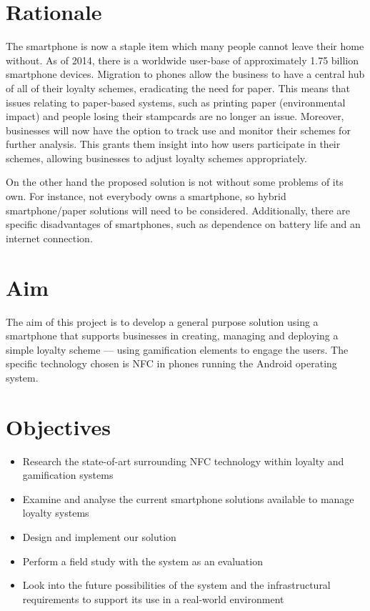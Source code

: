 \section{Rationale}
The smartphone is now a staple item which many people cannot leave their home without. As of 2014, there is a worldwide user-base of approximately 1.75 billion smartphone devices\cite{smartUsers}. Migration to phones allow the business to have a central hub of all of their loyalty schemes, eradicating the need for paper. This means that issues relating to paper-based systems, such as printing paper (environmental impact) and people losing their stampcards are no longer an issue. Moreover, businesses will now have the option to track use and monitor their schemes for further analysis. This grants them insight into how users participate in their schemes, allowing businesses to adjust loyalty schemes appropriately.

On the other hand the proposed solution is not without some problems of its own. For instance, not everybody owns a smartphone, so hybrid smartphone/paper solutions will need to be considered. Additionally, there are specific disadvantages of smartphones, such as dependence on battery life and an internet connection.

\section{Aim}
The aim of this project is to develop a general purpose solution using a smartphone that supports businesses in creating, managing and deploying a simple loyalty scheme --- using gamification elements to engage the users. The specific technology chosen is NFC in phones running the Android operating system. 

\section{Objectives}
\label{sec:objectives}
\begin{itemize}
    \item Research the state-of-art surrounding NFC technology within loyalty and gamification systems
    \item Examine and analyse the current smartphone solutions available to manage loyalty systems
    \item Design and implement our solution
    \item Perform a field study with the system as an evaluation
    \item Look into the future possibilities of the system and the infrastructural requirements to support its use in a real-world environment
\end{itemize}

